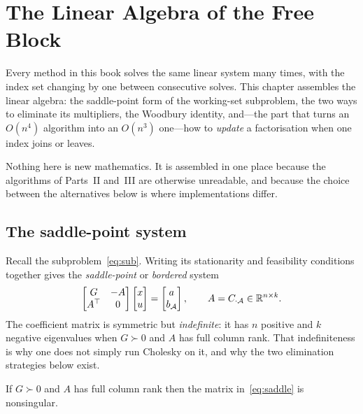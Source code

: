 \chapter{The Linear Algebra of the Free Block}
\label{ch:freeblock}

Every method in this book solves the same linear system many times, with the
index set changing by one between consecutive solves. This chapter assembles the
linear algebra: the saddle-point form of the working-set subproblem, the two ways
to eliminate its multipliers, the Woodbury identity, and---the part that turns an
$O(n^4)$ algorithm into an $O(n^3)$ one---how to \emph{update} a factorisation
when one index joins or leaves.

Nothing here is new mathematics. It is assembled in one place because the
algorithms of Parts~II and~III are otherwise unreadable, and because the choice
between the alternatives below is where implementations differ.

\section{The saddle-point system}

Recall the subproblem~\eqref{eq:sub}. Writing its stationarity and feasibility
conditions together gives the \emph{saddle-point} or \emph{bordered} system
\begin{equation}
  \begin{bmatrix} G & -A \\ A^{\top} & 0 \end{bmatrix}
  \begin{bmatrix} x \\ u \end{bmatrix}
  =
  \begin{bmatrix} a \\ b_{\mathcal{A}} \end{bmatrix},
  \qquad A = C_{\cdot\mathcal{A}} \in \mathbb{R}^{n\times k}.
  \label{eq:saddle}
\end{equation}
The coefficient matrix is symmetric but \emph{indefinite}: it has $n$ positive and
$k$ negative eigenvalues when $G \succ 0$ and $A$ has full column rank. That
indefiniteness is why one does not simply run Cholesky on it, and why the two
elimination strategies below exist.

\begin{proposition}[Nonsingularity]
\label{prop:saddlenonsing}
If $G \succ 0$ and $A$ has full column rank then the matrix in~\eqref{eq:saddle}
is nonsingular.
\end{proposition}

